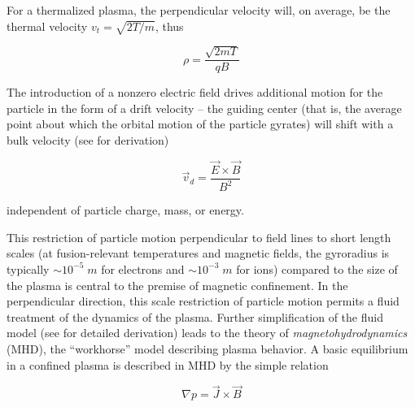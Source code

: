 \noindent For a thermalized plasma, the perpendicular velocity will, on average, be the thermal velocity $v_t = \sqrt{2T/m}$, thus

\begin{equation}\label{eq:gyroradius2}
 \rho = \frac{\sqrt{2mT}}{qB}
\end{equation}

\noindent The introduction of a nonzero electric field drives additional motion for the particle in the form of a drift velocity -- the guiding center (that is, the average point about which the orbital motion of the particle gyrates) will shift with a bulk velocity (see \cite[\S 8.4]{Freidberg2007} for derivation)

\begin{equation}\label{eq:exb}
 \vec{v}_d = \frac{\vec{E} \times \vec{B}}{B^2}
\end{equation}

\noindent independent of particle charge, mass, or energy.

This restriction of particle motion perpendicular to field lines to short length scales (at fusion-relevant temperatures and magnetic fields, the gyroradius is typically $\sim 10^{-5} \;\si{m}$ for electrons and $\sim 10^{-3} \;\si{m}$ for ions) compared to the size of the plasma is central to the premise of magnetic confinement.  In the perpendicular direction, this scale restriction of particle motion permits a fluid treatment of the dynamics of the plasma.  Further simplification of the fluid model (see \cite[\S 2.3]{Freidberg1987} for detailed derivation) leads to the theory of \emph{magnetohydrodynamics} (MHD), the ``workhorse'' model describing plasma behavior.  A basic equilibrium in a confined plasma is described in MHD by the simple relation

\begin{equation}\label{eq:MHDeq}
 \nabla p = \vec{J} \times \vec{B}
\end{equation}


